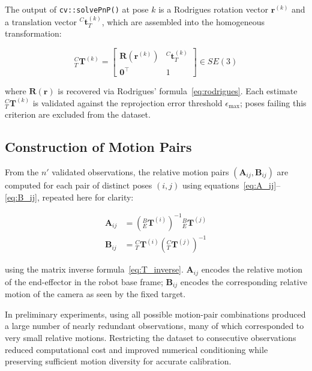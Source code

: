 The output of \texttt{cv::solvePnP()} at pose $k$ is a Rodrigues rotation
vector $\mathbf{r}^{(k)}$ and a translation vector ${}^C\mathbf{t}_T^{(k)}$,
which are assembled into the homogeneous transformation:

\begin{equation}
    {}^C_T\mathbf{T}^{(k)} =
    \begin{bmatrix}
        \mathbf{R}\!\left(\mathbf{r}^{(k)}\right) &
        {}^C\mathbf{t}_T^{(k)} \\
        \mathbf{0}^\top & 1
    \end{bmatrix} \in SE(3)
    \label{eq:CT_k}
\end{equation}

\noindent where $\mathbf{R}(\mathbf{r})$ is recovered via
Rodrigues' formula~\eqref{eq:rodrigues}. Each estimate
${}^C_T\mathbf{T}^{(k)}$ is validated against the reprojection error
threshold $\epsilon_{\max}$;
poses failing this criterion are excluded from the dataset.

\subsection{Construction of Motion Pairs}
\label{subsec:motion_pairs}

From the $n'$ validated observations, the relative motion pairs
$(\mathbf{A}_{ij}, \mathbf{B}_{ij})$ are computed for each pair of
distinct poses $(i, j)$ using equations~\eqref{eq:A_ij}--\eqref{eq:B_ij},
repeated here for clarity:

\begin{align}
    \mathbf{A}_{ij} &=
        \left({}^B_E\mathbf{T}^{(i)}\right)^{-1}
        {}^B_E\mathbf{T}^{(j)}
    \label{eq:A_ij_extr} \\[4pt]
    \mathbf{B}_{ij} &=
        {}^C_T\mathbf{T}^{(i)}
        \left({}^C_T\mathbf{T}^{(j)}\right)^{-1}
    \label{eq:B_ij_extr}
\end{align}

\noindent using the matrix inverse formula~\eqref{eq:T_inverse}.
$\mathbf{A}_{ij}$ encodes the relative motion of the end-effector in the
robot base frame; $\mathbf{B}_{ij}$ encodes the corresponding relative
motion of the camera as seen by the fixed target.

In preliminary experiments, using all possible motion-pair
combinations produced a large number of nearly redundant observations,
many of which corresponded to very small relative motions. Restricting
the dataset to consecutive observations reduced computational cost and
improved numerical conditioning while preserving sufficient motion
diversity for accurate calibration.

